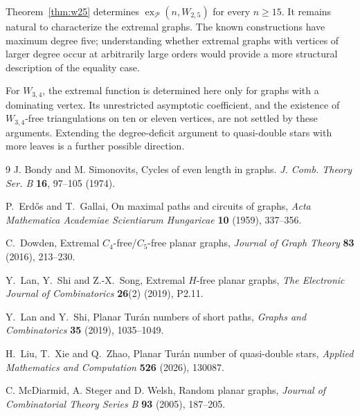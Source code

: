 \documentclass[11pt,a4paper]{article}
\theoremstyle{remark}
\newcommand{\ex}{\operatorname{ex}}
\newcommand{\PP}{\mathcal P}
\begin{document}
Theorem~\ref{thm:w25} determines $\ex_{\PP}(n,W_{2,5})$ for every $n\ge15$. It remains natural to characterize the extremal graphs. The known constructions have maximum degree five; understanding whether extremal graphs with vertices of larger degree occur at arbitrarily large orders would provide a more structural description of the equality case.

For $W_{3,4}$, the extremal function is determined here only for graphs with a dominating vertex. Its unrestricted asymptotic coefficient, and the existence of $W_{3,4}$-free triangulations on ten or eleven vertices, are not settled by these arguments. Extending the degree-deficit argument to quasi-double stars with more leaves is a further possible direction.

\begin{thebibliography}{9}
J. Bondy  and M. Simonovits,  Cycles of even length in graphs. \emph{J. Comb. Theory Ser. B} \textbf{16}, 97--105 (1974).

P.~Erd\H{o}s and T.~Gallai, On maximal paths and circuits of graphs, \emph{Acta Mathematica Academiae Scientiarum Hungaricae} \textbf{10} (1959), 337--356. 

C.~Dowden, Extremal $C_4$-free/$C_5$-free planar graphs, \emph{Journal of Graph Theory} \textbf{83} (2016), 213--230. 

Y.~Lan, Y.~Shi and Z.-X.~Song, Extremal $H$-free planar graphs, \emph{The Electronic Journal of Combinatorics} \textbf{26}(2) (2019), P2.11. %

Y.~Lan and Y.~Shi, Planar Tur\'an numbers of short paths, \emph{Graphs and Combinatorics} \textbf{35} (2019), 1035--1049. 

H.~Liu, T.~Xie and Q.~Zhao, Planar Tur\'an number of quasi-double stars, \emph{Applied Mathematics and Computation} \textbf{526} (2026), 130087. %

C. McDiarmid, A. Steger and D. Welsh, Random planar graphs, \emph{Journal of
Combinatorial Theory Series B} \textbf{93} (2005), 187--205.


\end{thebibliography}
\end{document}
